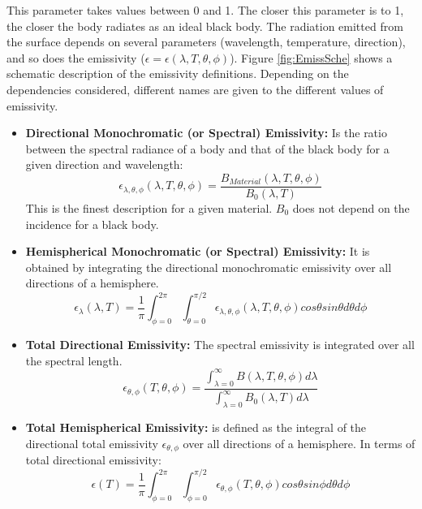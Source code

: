This parameter takes values between 0 and 1. The closer this parameter is to 1, the closer the body radiates as an ideal black body. The radiation emitted from the surface depends on several parameters (wavelength, temperature, direction), and so does the emissivity ($\epsilon = \epsilon(\lambda , T, \theta, \phi)$). Figure \ref{fig:EmissSche} shows a schematic description of the emissivity definitions. Depending on the dependencies considered, different names are given to the different values of emissivity. 

\begin{itemize}
    \item \textbf{Directional Monochromatic (or Spectral) Emissivity: } Is the ratio between the spectral radiance of a body and that of the black body for a given direction and wavelength:
    \begin{equation}
        \epsilon_{\lambda,\theta,\phi}\left(\lambda,T,\theta,\phi\right) = \frac{B_{Material}\left(\lambda,T,\theta,\phi\right)}{B_{0}\left(\lambda,T\right)}
    \end{equation}
    This is the finest description for a given material. $B_0$ does not depend on the incidence for a black body. 
    \item \textbf{Hemispherical Monochromatic (or Spectral) Emissivity: } It is obtained by integrating the directional monochromatic emissivity over all directions of a hemisphere.
    \begin{equation}
        \epsilon_{\lambda}\left(\lambda,T \right) = \frac{1}{\pi} \int_{\phi = 0}^{2\pi}\int_{\theta=0}^{\pi/2} \epsilon_{\lambda,\theta,\phi} \left(\lambda,T,\theta,\phi\right) cos\theta sin\theta d\theta d\phi
    \end{equation}
    \item \textbf{Total Directional Emissivity: } The spectral emissivity is integrated over all the spectral length.
    \begin{equation}
        \epsilon_{\theta,\phi}\left(T,\theta,\phi\right) = \frac{\int_{\lambda=0}^{\infty}B\left(\lambda,T,\theta,\phi\right)d\lambda}{\int_{\lambda=0}^{\infty}B_0\left(\lambda,T\right)d\lambda}
    \end{equation}
    \item \textbf{Total Hemispherical Emissivity: } is defined as the integral of the directional total emissivity $\epsilon_{\theta,\phi}$ over all directions of a hemisphere. In terms of total directional emissivity: 
    \begin{equation}
        \epsilon\left(T\right) = \frac{1}{\pi}\int^{2\pi}_{\phi=0}\int^{\pi/2}_{\phi=0}\epsilon_{\theta,\phi}\left(T,\theta,\phi\right)cos\theta sin \phi d\theta d\phi
    \end{equation}
\end{itemize}

